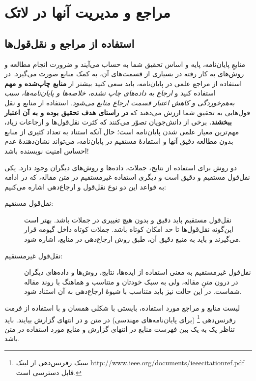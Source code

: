 \chapter{مراجع و مدیریت آنها در لاتک}
\label{app:refMan}

\thispagestyle{empty}

\section{استفاده از مراجع و نقل‌قول‌ها}
\label{sec:refUsage}
منابعِ پایان‌نامه، پایه و اساس تحقیق شما به حساب می‌آیند و ضرورت انجام مطالعه و روش‌های به کار رفته در بسیاری از قسمت‌های آن، به کمک منابع صورت می‌گیرد. در استفاده از مراجع علمی در پایان‌نامه، باید سعی کنید بیشتر از
\textbf{منابع چاپ‌شده و مهم}
استفاده کنید و
\emph{ارجاع به داده‌های چاپ نشده، خلاصه‌ها و پایان‌نامه‌ها، سبب به‌هم‌خوردگی و کاهش اعتبار قسمت ارجاع منابع می‌شود.}
استفاده از منابع و نقل قول‌هایی به تحقیق شما ارزش می‌دهند که
\textbf{در راستای هدف تحقیق بوده و به آن اعتبار ببخشند.}
برخی از دانش‌جویان تصوّر می‌کنند که کثرت نقل‌قول‌ها و ارجاعات زیاد، مهم‌ترین معیار علمی شدن پایان‌نامه است؛ حال آنکه استناد به تعداد کثیری از منابع بدون مطالعه دقیق آنها و استفادهٔ مستقیم در پایان‌نامه، می‌تواند نشان‌دهندهٔ عدم احساس امنیت نویسنده باشد!

دو روش برای استفاده از نتایج، جملات، داده‌ها و روش‌های دیگران وجود دارد. یکی نقل‌قول مستقیم و دقیق است و دیگری استفاده غیرمستقیم در متن مقاله، که در ادامه به قواعد این دو نوع نقل‌قول و ارجاع‌دهی اشاره می‌کنیم:
\begin{description}
	\item[نقل‌قول مستقیم:]
	نقل‌قول مستقیم باید دقیق و بدون هیچ تغییری در جملات باشد. بهتر است این‌گونه نقل‌قول‌ها تا حد امکان کوتاه باشد. جملات کوتاه داخل گیومه قرار می‌گیرند و باید به منبع دقیق آن، طبق روش ارجاع‌دهی در منابع، اشاره شود.
	\item[نقل‌قول غیرمستقیم:]
	نقل‌قول غیرمستقیم به معنی استفاده از ایده‌ها، نتایج، روش‌ها و داده‌های دیگران در درون متنِ مقاله، ولی به سبک خودتان و متناسب و هماهنگ با روند مقاله شماست. در این حالت نیز باید متناسب با شیوهٔ ارجاع‌دهی به آن استناد شود.
\end{description}

لیست منابع و مراجع مورد استفاده، بایستی با شکلی همسان و با استفاده از فرمت رفرنس‌دهی
%
\footnote{سبک رفرنس‌دهی  از لینک \url{http://www.ieee.org/documents/ieeecitationref.pdf} قابل دسترسی است.}
(برای پایان‌نامه‌های مهندسی)
در متن و در انتهای گزارش بیایند. باید تناظر یک به یک بین فهرست منابع در انتهای گزارش و منابع مورد استفاده در متن باشد.

